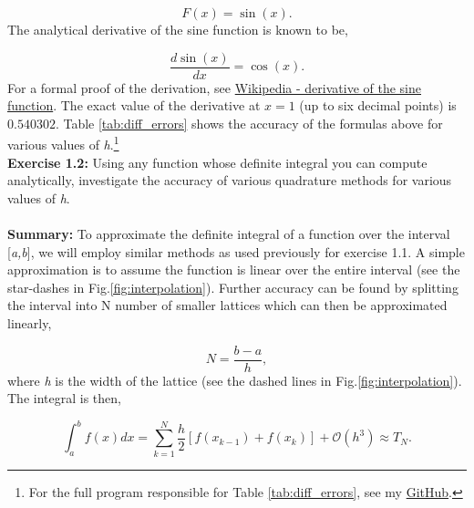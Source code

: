 \documentclass[10pt]{article}
\begin{document}
\[
	F(x) = \sin(x).
\]
The analytical derivative of the sine function is known to be,

\[
	\frac{d \sin(x)}{dx} = \cos(x).
\]
For a formal proof of the derivation, see \href{https://en.wikipedia.org/wiki/Differentiation_of_trigonometric_functions#Derivative_of_the_sine_function}{Wikipedia - derivative of the sine function}. The exact value of the derivative at $x=1$ (up to six decimal points) is $0.540302$. Table \ref{tab:diff_errors} shows the accuracy of the formulas above for various values of \textit{h}.\footnote{For the full program responsible for Table \ref{tab:diff_errors}, see my \href{https://github.com/jmelahman/computational-physics-solutions/blob/master/exercises_python/Chapter\%201/exercise1_1.py}{GitHub}.} \\

\newpage\noindent\label{exercise:1.2}\textbf{Exercise 1.2:} Using any function whose definite integral you can compute analytically, investigate the accuracy of various quadrature methods for various values of \textit{h}. \\
\\
\label{summary:1.2}\textbf{Summary:}
To approximate the definite integral of a function over the interval [\textit{a,b}], we will employ similar methods as used previously for exercise 1.1. A simple approximation is to assume the function is linear over the entire interval (see the star-dashes in Fig.\ref{fig:interpolation}). Further accuracy can be found by splitting the interval into N number of smaller lattices which can then be approximated linearly,

\[
	N = \frac{b-a}{h},
\]
where \textit{h} is the width of the lattice (see the dashed lines in Fig.\ref{fig:interpolation}). The integral is then,

\begin{equation}
	\label{eq:trapezoidal}
	\int^b_a f(x)dx = \sum^N_{k=1} \frac{h}{2}[f(x_{k-1})+f(x_k)] + \mathcal{O}(h^3) \approx T_N.
\end{equation}
\end{document}
